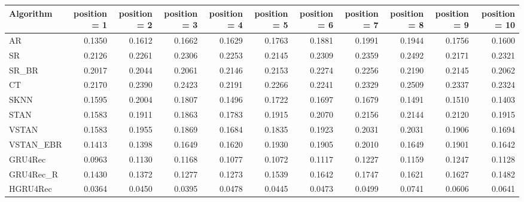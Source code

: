 \begin{tabular}{lrrrrrrrrrr}
\toprule
 Algorithm &  position = 1 &  position = 2 &  position = 3 &  position = 4 &  position = 5 &  position = 6 &  position = 7 &  position = 8 &  position = 9 &  position = 10 \\
\midrule
        AR &        0.1350 &        0.1612 &        0.1662 &        0.1629 &        0.1763 &        0.1881 &        0.1991 &        0.1944 &        0.1756 &         0.1600 \\
        SR &        0.2126 &        0.2261 &        0.2306 &        0.2253 &        0.2145 &        0.2309 &        0.2359 &        0.2492 &        0.2171 &         0.2321 \\
     SR\_BR &        0.2017 &        0.2044 &        0.2061 &        0.2146 &        0.2153 &        0.2274 &        0.2256 &        0.2190 &        0.2145 &         0.2062 \\
        CT &        0.2170 &        0.2390 &        0.2423 &        0.2191 &        0.2266 &        0.2241 &        0.2329 &        0.2509 &        0.2337 &         0.2324 \\
      SKNN &        0.1595 &        0.2004 &        0.1807 &        0.1496 &        0.1722 &        0.1697 &        0.1679 &        0.1491 &        0.1510 &         0.1403 \\
      STAN &        0.1583 &        0.1911 &        0.1863 &        0.1783 &        0.1915 &        0.2070 &        0.2156 &        0.2144 &        0.2120 &         0.1915 \\
     VSTAN &        0.1583 &        0.1955 &        0.1869 &        0.1684 &        0.1835 &        0.1923 &        0.2031 &        0.2031 &        0.1906 &         0.1694 \\
 VSTAN\_EBR &        0.1413 &        0.1398 &        0.1649 &        0.1620 &        0.1930 &        0.1905 &        0.2010 &        0.1649 &        0.1901 &         0.1642 \\
   GRU4Rec &        0.0963 &        0.1130 &        0.1168 &        0.1077 &        0.1072 &        0.1117 &        0.1227 &        0.1159 &        0.1247 &         0.1128 \\
 GRU4Rec\_R &        0.1430 &        0.1372 &        0.1277 &        0.1273 &        0.1539 &        0.1642 &        0.1747 &        0.1621 &        0.1627 &         0.1482 \\
  HGRU4Rec &        0.0364 &        0.0450 &        0.0395 &        0.0478 &        0.0445 &        0.0473 &        0.0499 &        0.0741 &        0.0606 &         0.0641 \\
\bottomrule
\end{tabular}
